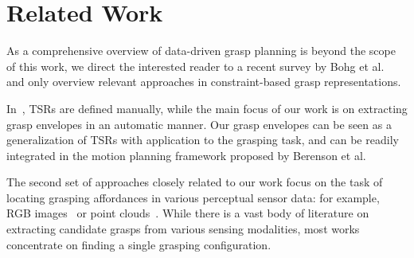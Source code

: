 \section{Related Work}
\label{sec:related}
As a comprehensive overview of data-driven grasp planning is beyond the scope of this work, we direct the interested reader to a recent survey by Bohg et al.~\cite{Bohg14} and only overview relevant approaches in constraint-based grasp representations.

In~\cite{Bere11}, TSRs are defined manually, while the main focus of our work is on extracting grasp envelopes in an automatic manner.
Our grasp envelopes can be seen as a generalization of TSRs with application to the grasping task, and can be readily integrated in the motion planning framework proposed by Berenson et al.
%
\par
The second set of approaches closely related to our work focus on the task of locating grasping affordances in various perceptual sensor data: for example, RGB images~\cite{Saxe08} or point clouds~\cite{Pas13}.
While there is a vast body of literature on extracting candidate grasps from various sensing modalities, most works concentrate on finding a single grasping configuration.